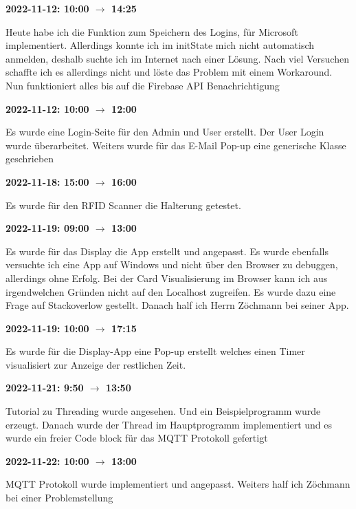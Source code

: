 \vspace{0.5cm} \textbf{2022-11-12: 10:00 $\rightarrow$ 14:25} 

Heute habe ich die Funktion zum Speichern des Logins, f\"ur Microsoft implementiert.
Allerdings konnte ich im initState mich nicht automatisch anmelden,
deshalb suchte ich im Internet nach einer Lösung. Nach viel Versuchen schaffte ich es allerdings nicht und löste das Problem mit einem Workaround. Nun funktioniert alles bis auf die Firebase API Benachrichtigung

\vspace{0.5cm} \textbf{2022-11-12: 10:00 $\rightarrow$ 12:00} 

Es wurde eine Login-Seite für den Admin und User erstellt. Der User Login wurde
überarbeitet. Weiters wurde für das E-Mail Pop-up eine generische Klasse
geschrieben

\vspace{0.5cm} \textbf{2022-11-18: 15:00 $\rightarrow$ 16:00} 

Es wurde für den RFID Scanner die Halterung getestet.

\vspace{0.5cm} \textbf{2022-11-19: 09:00 $\rightarrow$ 13:00} 

Es wurde für das
Display die App erstellt und angepasst. Es wurde ebenfalls versuchte ich eine
App auf Windows und nicht über den Browser zu debuggen, allerdings ohne
Erfolg. Bei der Card Visualisierung im Browser kann ich aus irgendwelchen
Gründen nicht auf den Localhost zugreifen. Es wurde dazu eine Frage auf
Stackoverlow gestellt. Danach half ich Herrn Zöchmann bei seiner App.

\vspace{0.5cm} \textbf{2022-11-19: 10:00 $\rightarrow$ 17:15} 

Es wurde für die Display-App eine Pop-up erstellt welches einen Timer visualisiert zur Anzeige der restlichen Zeit.

\vspace{0.5cm} \textbf{2022-11-21: 9:50 $\rightarrow$ 13:50} 

Tutorial zu Threading wurde angesehen. Und ein Beispielprogramm wurde erzeugt. Danach wurde der Thread im Hauptprogramm implementiert und es wurde ein freier Code block für
das MQTT Protokoll gefertigt

\vspace{0.5cm} \textbf{2022-11-22: 10:00 $\rightarrow$ 13:00} 

MQTT Protokoll wurde implementiert und angepasst. Weiters half ich Zöchmann bei einer
Problemstellung

